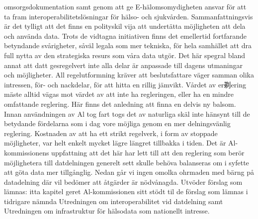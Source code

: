 {{{{{{{{omsorgsdokumentation samt genom att ge E-hälomsomydigheten ansvar för att ta fram interoperabilitetslösningar för hälso- och sjukvården.
Sammanfattningsvis är det tylligt att det finns en polityskil vija att undertätta möjligheten att dela och använda data. Trots de vidtagna initiativen finns det emellertid fortfarande betyndande svårigheter, såväl legala som mer tekniska, för hela samhället att dra full nytta av den strategiska resurs som våra data utgör. Det här spegral bland annat att datt gesregelvert inte alla delar är anpassade till dagens utmaningar och möjligheter. All regelutformning kräver att beslutsfattare väger samman olika intressen, för- och nackdelar, för att hitta en rillig jämvikt. Vårdet av er剃ering mäste alltid vägas mot värdet av att inte ha regleringen, eller ha en mindre omfattande reglering. Här finns det anledning att finna en delvis ny balsom.
Innan användningen av Al tog fart togs det av naturliga skäl inte hänsynt till de betydande fördelarna som i dag vore möjliga genom en mer delningsvänlig reglering. Kostnaden av att ha ett strikt regelverk, i form av stoppade möjligheter, var helt enkelt mycket lägre längret tillbakka i tiden. Det är Al-kommissionens uppfattning att det här har lett till att den reglering som berör möjlighetera till datdelningen generelt sett skulle behöva balanseras om i syfette att göta data mer tillgånglig.
Nedan går vi ingen omolka ohrmaden med bärng på datadelning där vil bedömer att åtgärder är nödvånagda. Utvöder förslag som lämnas: itta kapitel geret Al-kommissionen sitt stödt til de förslag som lämnas i tidrigare nämnda Utredningen om interoperabilitet vid datdelning samt Utredningen om infrastruktur för hälsodata som nationellt intresse.
}}}}}}}}
